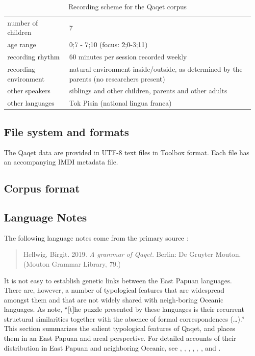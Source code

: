 \documentclass[a4paper, 11pt]{book}
\begin{document}
\begin{table}[ht]
	\centering
	\begin{tabular}{ll}
		\toprule
		number of children & 7 \\
                age range & 0;7 - 7;10 (focus: 2;0-3;11) \\
                recording rhythm & 60 minutes per session recorded weekly \\
                recording environment & natural environment inside/outside, as determined by the
		parents (no researchers present) \\
                other speakers & siblings and other children, parents and other adults \\
                other languages	& Tok Pisin (national lingua franca)\\
                \bottomrule
	\end{tabular}
	\caption{Recording scheme for the Qaqet corpus}
	\label{tab:Qaqet recording scheme}
\end{table}


\subsection{File system and formats}

The Qaqet data are provided in UTF-8 text files in Toolbox format. Each file has an accompanying IMDI metadata file.

\subsection{Corpus format}

\subsection{Language Notes}

The following language notes come from the primary source \citep{Hellwig2019}:
\begin{quote}
Hellwig, Birgit. 2019. \textit{A grammar of Qaqet.} Berlin: De Gruyter Mouton. (Mouton Grammar Library, 79.)
\end{quote}

It is not easy to establish genetic links between the East Papuan languages. There are, however, a number of typological features that are widespread amongst them and that are not widely shared with neigh-boring Oceanic languages.
As \citet[128]{lindstrom2007languages} note, “[t]he puzzle presented by these languages is their recurrent structural similarities together with the absence of formal correspondences (…).” This section summarizes the salient typological features of Qaqet, and places them in an East Papuan and areal perspective.
For detailed accounts of their distribution in East Papuan and neighboring Oceanic,
see \citet{donohue2007typology},
\citet*{dunn2002east},
\citet{dunn2008structural},
\citet{lindstrom2007languages},
\citet{reesink2005sulka},
\cite{ross19968},
\citet*{stebbins2009papuan}
and \citet*{terrill2002systems}.
\end{document}
